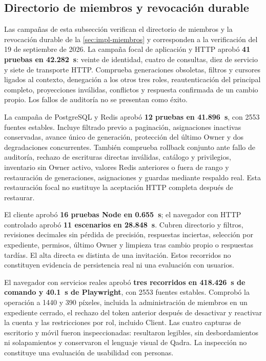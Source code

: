 \subsection{Directorio de miembros y revocación durable}\label{sec:pruebas-miembros}

Las campañas de esta subsección verifican el directorio de miembros y la revocación durable de la \cref{sec:impl-miembros} y corresponden a la verificación del 19 de septiembre de 2026. La campaña focal de aplicación y HTTP aprobó \textbf{41 pruebas en 42.282~s}: veinte de identidad, cuatro de consultas, diez de servicio y siete de transporte HTTP. Comprueba generaciones obsoletas, filtros y cursores ligados al contexto, denegación a los otros tres roles, reautenticación del principal completo, proyecciones inválidas, conflictos y respuesta confirmada de un cambio propio. Los fallos de auditoría no se presentan como éxito.

La campaña de PostgreSQL y Redis aprobó \textbf{12 pruebas en 41.896~s}, con 2553 fuentes estables. Incluye filtrado previo a paginación, asignaciones inactivas conservadas, avance único de generación, protección del último Owner y dos degradaciones concurrentes. También comprueba rollback conjunto ante fallo de auditoría, rechazo de escrituras directas inválidas, catálogo y privilegios, inventario sin Owner activo, valores Redis anteriores o fuera de rango y restauración de generaciones, asignaciones y guardas mediante respaldo real. Esta restauración focal no sustituye la aceptación HTTP completa después de restaurar.

El cliente aprobó \textbf{16 pruebas Node en 0.655~s}; el navegador con HTTP controlado aprobó \textbf{11 escenarios en 28.848~s}. Cubren directorio y filtros, revisiones decimales sin pérdida de precisión, respuestas inciertas, selección por expediente, permisos, último Owner y limpieza tras cambio propio o respuestas tardías. El alta directa es distinta de una invitación. Estos recorridos no constituyen evidencia de persistencia real ni una evaluación con usuarios.

El navegador con servicios reales aprobó \textbf{tres recorridos en 418.426~s de comando y 40.1~s de Playwright}, con 2553 fuentes estables. Comprobó la operación a 1440 y 390 píxeles, incluida la administración de miembros en un expediente cerrado, el rechazo del token anterior después de desactivar y reactivar la cuenta y las restricciones por rol, incluido Client. Las cuatro capturas de escritorio y móvil fueron inspeccionadas: resultaron legibles, sin desbordamientos ni solapamientos y conservaron el lenguaje visual de Qadra. La inspección no constituye una evaluación de usabilidad con personas.

